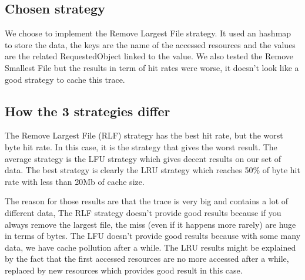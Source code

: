 \subsection{Chosen strategy}

We choose to implement the Remove Largest File strategy. It used an hashmap
to store the data, the keys are the name of the accessed resources and the
values are the related RequestedObject linked to the value. We also tested
the Remove Smallest File but the results in term of hit rates were worse,
it doesn't look like a good strategy to cache this trace.

\subsection{How the 3 strategies differ}

The Remove Largest File (RLF) strategy has the best hit rate, but the worst byte
hit rate. In this case, it is the strategy that gives the worst result. The
average strategy is the LFU strategy which gives decent results on our set
of data. The best strategy is clearly the LRU strategy which reaches 50\%
of byte hit rate with less than 20Mb of cache size. \newline

The reason for those results are that the trace is very big and contains a
lot of different data, The RLF strategy doesn't provide good results
because if you always remove the largest file, the miss (even if it happens
more rarely) are huge in terms of bytes. The LFU doesn't provide good
results because with some many data, we have cache pollution after a while.
The LRU results might be explained by the fact that the first accessed
resources are no more accessed after a while, replaced by new resources
which provides good result in this case. \newline
